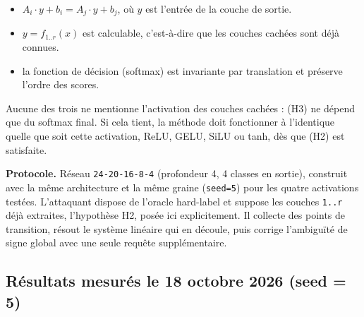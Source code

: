 \documentclass[11pt]{article}
\begin{document}
\begin{itemize}[leftmargin=2.2em]
  \item[(H1)] $A_i \cdot y + b_i = A_j \cdot y + b_j$, où $y$ est l'entrée de la couche de sortie.
  \item[(H2)] $y = f_{1..r}(x)$ est calculable, c'est-à-dire que les couches cachées sont déjà connues.
  \item[(H3)] la fonction de décision (softmax) est invariante par translation et préserve l'ordre des scores.
\end{itemize}

Aucune des trois ne mentionne l'activation des couches cachées : (H3) ne dépend que du softmax final. Si cela tient, la méthode doit fonctionner à l'identique quelle que soit cette activation, ReLU, GELU, SiLU ou tanh, dès que (H2) est satisfaite.

\textbf{Protocole.} Réseau \texttt{24-20-16-8-4} (profondeur 4, 4 classes en sortie), construit avec la même architecture et la même graine (\texttt{seed=5}) pour les quatre activations testées. L'attaquant dispose de l'oracle hard-label et suppose les couches \texttt{1..r} déjà extraites, l'hypothèse H2, posée ici explicitement. Il collecte des points de transition, résout le système linéaire qui en découle, puis corrige l'ambiguïté de signe global avec une seule requête supplémentaire.

\subsection*{Résultats mesurés le 18 octobre 2026 (seed = 5)}
\end{document}
